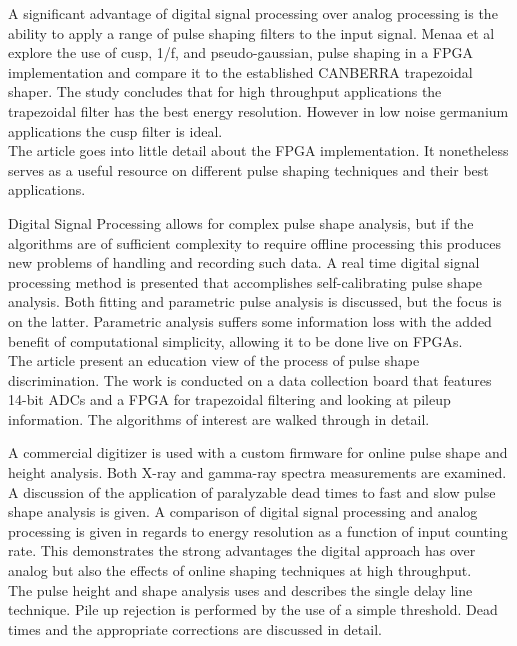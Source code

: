 \documentclass[12pt]{article}
\begin{document}
\begin{doublespacing}
{\large\textbf{\cite{Menaa2011512}}}

A significant advantage of digital signal processing over analog processing is the ability to apply a range of pulse shaping filters to the input signal.
Menaa et al explore the use of cusp, 1/f, and pseudo-gaussian, pulse shaping in a FPGA implementation and compare it to the established CANBERRA trapezoidal shaper.
The study concludes that for high throughput applications the trapezoidal filter has the best energy resolution.
However in low noise germanium applications the cusp filter is ideal.
\\

The article goes into little detail about the FPGA implementation.
It nonetheless serves as a useful resource on different pulse shaping techniques and their best applications.


{\large\textbf{\cite{Suarez2008276}}}
Digital Signal Processing allows for complex pulse shape analysis, but if the algorithms are of sufficient complexity to require offline processing this produces new problems of handling and recording such data.
A real time digital signal processing method is presented that accomplishes self-calibrating pulse shape analysis.
Both fitting and parametric pulse analysis is discussed, but the focus is on the latter.
Parametric analysis suffers some information loss with the added benefit of computational simplicity, allowing it to be done live on FPGAs.
\\

The article present an education view of the process of pulse shape discrimination.
The work is conducted on a data collection board that features 14-bit ADCs and a FPGA for trapezoidal filtering and looking at pileup information.
The algorithms of interest are walked through in detail.


{\large\textbf{\cite{Abbene2013124}}}
A commercial digitizer is used with a custom firmware for online pulse shape and height analysis.
Both X-ray and gamma-ray spectra measurements are examined.
A discussion of the application of paralyzable dead times to fast and slow pulse shape analysis is given.
A comparison of digital signal processing and analog processing is given in regards to energy resolution as a function of input counting rate.
This demonstrates the strong advantages the digital approach has over analog but also the effects of online shaping techniques at high throughput.
\\

The pulse height and shape analysis uses and describes the single delay line technique.
Pile up rejection is performed by the use of a simple threshold.
Dead times and the appropriate corrections are discussed in detail.



\end{doublespacing}
\end{document}
